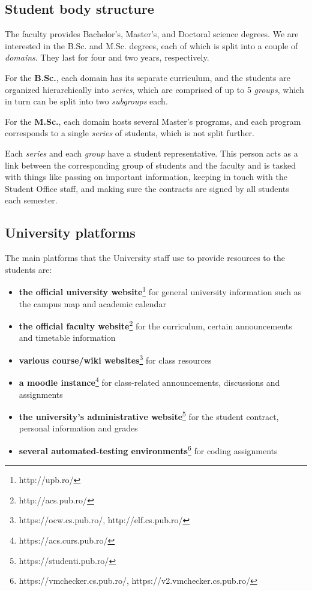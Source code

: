     \subsection{Student body structure} \label{1:student_body_structure}
    
        The faculty provides Bachelor's, Master's, and Doctoral science degrees. We are interested in the B.Sc. and M.Sc. degrees, each of which is split into a couple of \textit{domains}. They last for four and two years, respectively.
        
        For the \textbf{B.Sc.}, each domain has its separate curriculum, and the students are organized hierarchically into \textit{series}, which are comprised of up to 5 \textit{groups}, which in turn can be split into two \textit{subgroups} each.
        
        For the \textbf{M.Sc.}, each domain hosts several Master's programs, and each program corresponds to a single \textit{series} of students, which is not split further.
        
        Each \textit{series} and each \textit{group} have a student representative. This person acts as a link between the corresponding group of students and the faculty and is tasked with things like passing on important information, keeping in touch with the Student Office staff, and making sure the contracts are signed by all students each semester.
    
    \subsection{University platforms} \label{1:university_platforms}
    
        The main platforms that the University staff use to provide resources to the students are:
        
        \begin{itemize}
            \setlength{\topsep}{0.5pt}
            \setlength{\itemsep}{0.5pt}
            \setlength{\parsep}{0.5pt}
            \item \textbf{the official university website}\footnote{http://upb.ro/} for general university information such as the campus map and academic calendar
            \item \textbf{the official faculty website}\footnote{http://acs.pub.ro/} for the curriculum, certain announcements and timetable information
            \item \textbf{various course/wiki websites}\footnote{https://ocw.cs.pub.ro/, http://elf.cs.pub.ro/} for class resources
            \item \textbf{a \gls{moodle} instance}\footnote{https://acs.curs.pub.ro/} for class-related announcements, discussions and assignments
            \item \textbf{the university's administrative website}\footnote{https://studenti.pub.ro/} for the student contract, personal information and grades
            \item \textbf{several automated-testing environments}\footnote{https://vmchecker.cs.pub.ro/, https://v2.vmchecker.cs.pub.ro/} for coding assignments
        \end{itemize}
    
